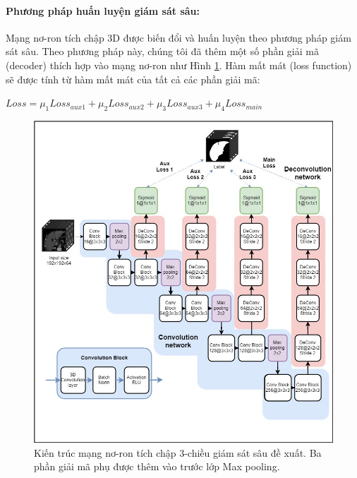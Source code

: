 \paragraph{Phương pháp huấn luyện giám sát sâu:}
Mạng nơ-ron tích chập 3D được biến đổi và huấn luyện theo phương pháp giám sát sâu. Theo phương pháp này, chúng tôi đã thêm một số phần giải mã (decoder) thích hợp vào mạng nơ-ron như Hình \ref{our_CNN}. Hàm mất mát (loss function) sẽ được tính từ hàm mất mát của tất cả các phần giải mã:\\
\begin{center} $Loss = \mu_1 Loss_{aux1} + \mu_2 Loss_{aux2}+\mu_3 Loss_{aux3}+\mu_4 Loss_{main}$\end{center}
\begin{figure}[h]
\centering
    \includegraphics[totalheight=15cm]{Images/CNN.jpg}
    \caption{Kiến trúc mạng nơ-ron tích chập 3-chiều giám sát sâu đề xuất. Ba phần giải mã phụ được thêm vào trước lớp Max pooling.}
    \label{our_CNN}
\end{figure}
